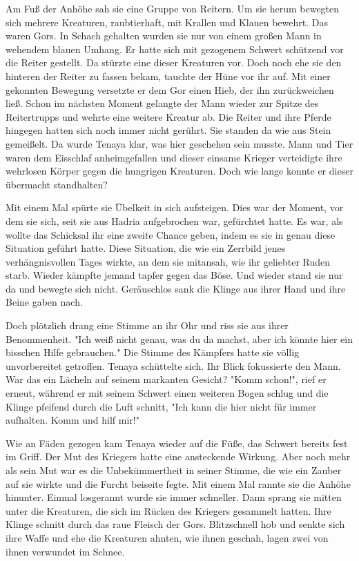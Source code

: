 \documentclass[10pt, a4paper, oneside]{book}
\begin{document}
\begin{multicols}{2}
Am Fuß der Anhöhe sah sie eine Gruppe von Reitern. Um sie herum bewegten sich mehrere Kreaturen, raubtierhaft, mit Krallen und Klauen bewehrt. Das waren Gors. In Schach gehalten wurden sie nur von einem großen Mann in wehendem blauen Umhang. Er hatte sich mit gezogenem Schwert schützend vor die Reiter gestellt. Da stürzte eine dieser Kreaturen vor. Doch noch ehe sie den hinteren der Reiter zu fassen bekam, tauchte der Hüne vor ihr auf. Mit einer gekonnten Bewegung versetzte er dem Gor einen Hieb, der ihn zurückweichen ließ. Schon im nächsten Moment gelangte der Mann wieder zur Spitze des Reitertrupps und wehrte eine weitere Kreatur ab. Die Reiter und ihre Pferde hingegen hatten sich noch immer nicht gerührt. Sie standen da wie aus Stein gemeißelt. Da wurde Tenaya klar, was hier geschehen sein musste. Mann und Tier waren dem Eisschlaf anheimgefallen und dieser einsame Krieger verteidigte ihre wehrlosen Körper gegen die hungrigen Kreaturen. Doch wie lange konnte er dieser übermacht standhalten?

Mit einem Mal spürte sie Übelkeit in sich aufsteigen. Dies war der Moment, vor dem sie sich, seit sie aus Hadria aufgebrochen war, gefürchtet hatte. Es war, als wollte das Schicksal ihr eine zweite Chance geben, indem es sie in genau diese Situation geführt hatte. Diese Situation, die wie ein Zerrbild jenes verhängnisvollen Tages wirkte, an dem sie mitansah, wie ihr geliebter Ruden starb. Wieder kämpfte jemand tapfer gegen das Böse. Und wieder stand sie nur da und bewegte sich nicht. Geräuschlos sank die Klinge aus ihrer Hand und ihre Beine gaben nach.

Doch plötzlich drang eine Stimme an ihr Ohr und riss sie aus ihrer Benommenheit. "Ich weiß nicht genau, was du da machst, aber ich könnte hier ein bisschen Hilfe gebrauchen." Die Stimme des Kämpfers hatte sie völlig unvorbereitet getroffen. Tenaya schüttelte sich. Ihr Blick fokussierte den Mann. War das ein Lächeln auf seinem markanten Gesicht? "Komm schon!", rief er erneut, während er mit seinem Schwert einen weiteren Bogen schlug und die Klinge pfeifend durch die Luft schnitt, "Ich kann die hier nicht für immer aufhalten. Komm und hilf mir!"

Wie an Fäden gezogen kam Tenaya wieder auf die Füße, das Schwert bereits fest im Griff. Der Mut des Kriegers hatte eine ansteckende Wirkung. Aber noch mehr als sein Mut war es die Unbekümmertheit in seiner Stimme, die wie ein Zauber auf sie wirkte und die Furcht beiseite fegte. Mit einem Mal rannte sie die Anhöhe hinunter. Einmal losgerannt wurde sie immer schneller. Dann sprang sie mitten unter die Kreaturen, die sich im Rücken des Kriegers gesammelt hatten. Ihre Klinge schnitt durch das raue Fleisch der Gors. Blitzschnell hob und senkte sich ihre Waffe und ehe die Kreaturen ahnten, wie ihnen geschah, lagen zwei von ihnen verwundet im Schnee. 


\end{multicols}
\end{document}
